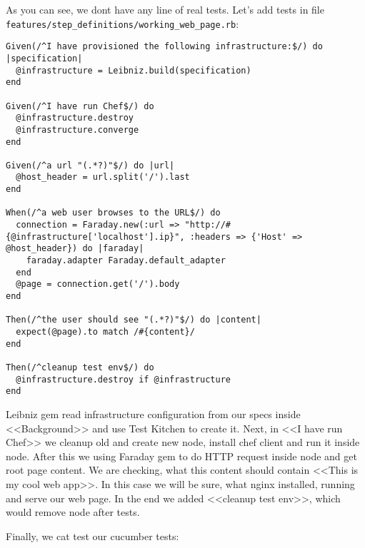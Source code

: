 As you can see, we dont have any line of real tests. Let's add tests in file \lstinline!features/step_definitions/working_web_page.rb!:

\begin{lstlisting}[label=lst:testing-cucumber-spec6]
Given(/^I have provisioned the following infrastructure:$/) do |specification|
  @infrastructure = Leibniz.build(specification)
end

Given(/^I have run Chef$/) do
  @infrastructure.destroy
  @infrastructure.converge
end

Given(/^a url "(.*?)"$/) do |url|
  @host_header = url.split('/').last
end

When(/^a web user browses to the URL$/) do
  connection = Faraday.new(:url => "http://#{@infrastructure['localhost'].ip}", :headers => {'Host' => @host_header}) do |faraday|
    faraday.adapter Faraday.default_adapter
  end
  @page = connection.get('/').body
end

Then(/^the user should see "(.*?)"$/) do |content|
  expect(@page).to match /#{content}/
end

Then(/^cleanup test env$/) do
  @infrastructure.destroy if @infrastructure
end
\end{lstlisting}

Leibniz gem read infrastructure configuration from our specs inside <<Background>> and use Test Kitchen to create it. Next, in <<I have run Chef>> we cleanup old and create new node, install chef client and run it inside node. After this we using Faraday gem to do HTTP request inside node and get root page content. We are checking, what this content should contain <<This is my cool web app>>. In this case we will be sure, what nginx installed, running and serve our web page. In the end we added <<cleanup test env>>, which would remove node after tests.

Finally, we cat test our cucumber tests:

